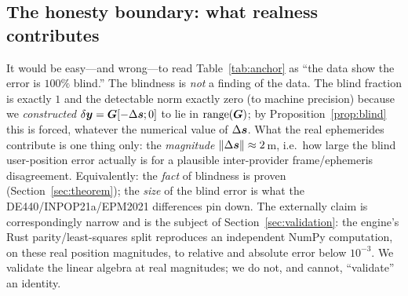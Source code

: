 \subsection{The honesty boundary: what realness contributes}
\label{sec:honestyboundary}

It would be easy---and wrong---to read Table~\ref{tab:anchor} as ``the data show the
error is $100\%$ blind.'' The blindness is \emph{not} a finding of the data. The blind
fraction is exactly $1$ and the detectable norm exactly zero (to machine precision)
because we \emph{constructed} $\delta\bm{y}=\bm{G}[-\Delta\bm{s};0]$ to lie in $\operatorname{range}(\bm{G})$; by
Proposition~\ref{prop:blind} this is forced, whatever the numerical value of $\Delta\bm{s}$. What
the real ephemerides contribute is one thing only: the \emph{magnitude}
$\|\Delta\bm{s}\|\approx2\,$m, i.e.\ how large the blind user-position error actually is for a
plausible inter-provider frame/ephemeris disagreement. Equivalently: the \emph{fact} of
blindness is proven (Section~\ref{sec:theorem}); the \emph{size} of the blind error is
what the DE440/INPOP21a/EPM2021 differences pin down. The externally \Validated{} claim
is correspondingly narrow and is the subject of Section~\ref{sec:validation}: the
engine's Rust parity/least-squares split reproduces an independent NumPy computation, on
these real position magnitudes, to relative and absolute error below $10^{-3}$. We
validate the linear algebra at real magnitudes; we do not, and cannot, ``validate'' an
identity.
